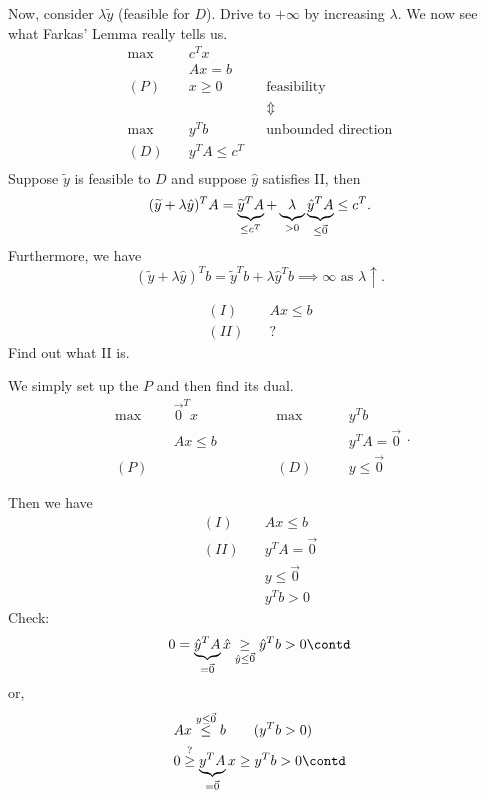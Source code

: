 \begin{remark}
	Now, consider \(\lambda \widetilde{y}\) (feasible for \(D\)). Drive to \(+\infty \) by increasing \(\lambda\). We now see what Farkas' Lemma really tells us.
	\begin{align*}
		\max~    & c^{T} x                                            \\
		         & Ax = b                                             \\
		(P)\quad & x\geq 0            &  & \text{feasibility}         \\
		         &                    &  & \Updownarrow               \\
		\max~    & y^{T}b             &  & \text{unbounded direction} \\
		(D)\quad & y^{T} A \leq c^{T}                                 \\
	\end{align*}
	Suppose \(\widetilde{y}\) is feasible to \(D\) and suppose \(\hat{y}\) satisfies II, then
	\[
		(\widetilde{y}+\lambda \hat{y})^{T} A = \underbrace{\widetilde{y}^{T}A}_{\leq c^{T}} + \underbrace{\vphantom{y}\lambda}_{>0} \underbrace{\hat{y}^{T} A}_{\leq \vec{0}} \leq c^{T}.
	\]
	Furthermore, we have
	\[
		(\widetilde{y}+\lambda \hat{y})^{T} b = \widetilde{y}^{T} b+\lambda \hat{y}^{T} b \implies \infty \text{ as } \lambda \uparrow  .
	\]
\end{remark}

\begin{eg}
	\begin{align*}
		(I)\quad  & Ax\leq b \\
		(II)\quad & ?
	\end{align*}
	Find out what II is.

	We simply set up the \(P\) and then find its dual.
	\[
		\begin{alignedat}{5}
			\max~&\vec{0}^{T} x\qquad\qquad	&&\max ~&&y^{T}b\\
			&Ax \leq b 			&&			&&y^{T} A =\vec{0}\\
			(P)\quad&			&&(D)\quad	&&y\leq \vec{0}
		\end{alignedat}.
	\]

	Then we have
	\begin{align*}
		(I)\quad  & Ax\leq b         \\
		(II)\quad & y^{T}A = \vec{0} \\
		          & y\leq \vec{0}    \\
		          & y^{T} b>0
	\end{align*}
	Check\(\colon\)
	\[
		0 = \underbrace{\hat{y}^{T} A}_{=\vec{0}} \hat{x} \underset{\hat{y} \leq \vec{0}}{\geq}  \hat{y}^{T} b>0 \contd
	\]
	or,
	\[
		\begin{split}
			&Ax \overset{y\leq \vec{0}}{\leq} b\qquad (y^{T}b>0)\\
			&0 \overset{?}{\geq} \underbrace{y^{T}A}_{ = \vec{0}} x\geq y^{T}b>0\contd
		\end{split}
	\]
\end{eg}


